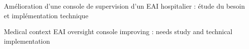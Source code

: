 Amélioration d'une console de supervision d'un
EAI hospitalier : étude du besoin et implémentation technique

Medical context EAI oversight console improving : needs study and technical
implementation
